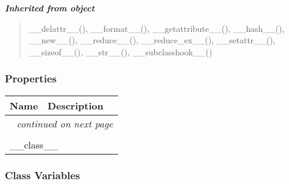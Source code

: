 \large{\textbf{\textit{Inherited from object}}}

\begin{quote}
\_\_delattr\_\_(), \_\_format\_\_(), \_\_getattribute\_\_(), \_\_hash\_\_(), \_\_new\_\_(), \_\_reduce\_\_(), \_\_reduce\_ex\_\_(), \_\_setattr\_\_(), \_\_sizeof\_\_(), \_\_str\_\_(), \_\_subclasshook\_\_()
\end{quote}


  \subsubsection{Properties}

    \vspace{-1cm}
\hspace{\varindent}\begin{longtable}{|p{\varnamewidth}|p{\vardescrwidth}|l}
\cline{1-2}
\cline{1-2} \centering \textbf{Name} & \centering \textbf{Description}& \\
\cline{1-2}
\endhead\cline{1-2}\multicolumn{3}{r}{\small\textit{continued on next page}}\\\endfoot\cline{1-2}
\endlastfoot\multicolumn{2}{|l|}{\textit{Inherited from object}}\\
\multicolumn{2}{|p{\varwidth}|}{\raggedright \_\_class\_\_}\\
\cline{1-2}
\end{longtable}



  \subsubsection{Class Variables}

